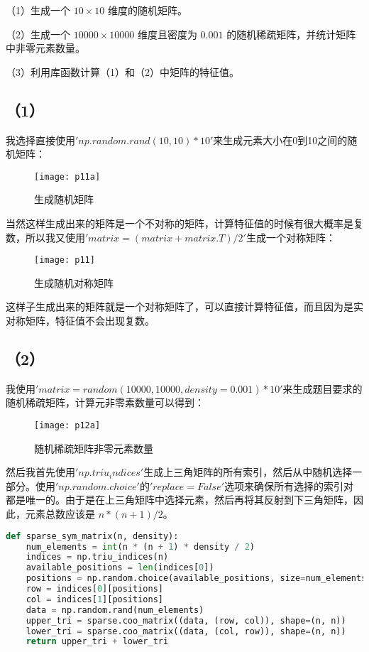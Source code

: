 \documentclass{source/Report}
\begin{document}
（1）生成一个 $10\times10$ 维度的随机矩阵。

（2）生成一个 $10000\times 10000$ 维度且密度为 $0.001$ 的随机稀疏矩阵，并统计矩阵中非零元素数量。

（3）利用库函数计算（1）和（2）中矩阵的特征值。

\subsection*{（1）}
我选择直接使用$'np.random.rand(10, 10) * 10'$来生成元素大小在0到10之间的随机矩阵：
\begin{figure}[H]
  \centering
  \texttt{[image: p11a]}
  \caption{生成随机矩阵}
\end{figure}

当然这样生成出来的矩阵是一个不对称的矩阵，计算特征值的时候有很大概率是复数，所以我又使用$'matrix = (matrix + matrix.T) / 2'$生成一个对称矩阵：
\begin{figure}[H]
  \centering
  \texttt{[image: p11]}
  \caption{生成随机对称矩阵}
\end{figure}

这样子生成出来的矩阵就是一个对称矩阵了，可以直接计算特征值，而且因为是实对称矩阵，特征值不会出现复数。

\subsection*{（2）}
我使用$'matrix = random(10000, 10000, density=0.001) * 10'$来生成题目要求的随机稀疏矩阵，计算元非零素数量可以得到：
\begin{figure}[H]
  \centering
  \texttt{[image: p12a]}
  \caption{随机稀疏矩阵非零元素数量}
\end{figure}

然后我首先使用$'np.triu_indices'$生成上三角矩阵的所有索引，然后从中随机选择一部分。使用$'np.random.choice'$的$'replace=False'$选项来确保所有选择的索引对都是唯一的。由于是在上三角矩阵中选择元素，然后再将其反射到下三角矩阵，因此，元素总数应该是 $n * (n + 1) / 2$。

\begin{lstlisting}[language = Python, title = {生成随机对称稀疏矩阵}]
def sparse_sym_matrix(n, density):
    num_elements = int(n * (n + 1) * density / 2)
    indices = np.triu_indices(n)
    available_positions = len(indices[0])
    positions = np.random.choice(available_positions, size=num_elements, replace=False)
    row = indices[0][positions]
    col = indices[1][positions]
    data = np.random.rand(num_elements)
    upper_tri = sparse.coo_matrix((data, (row, col)), shape=(n, n))
    lower_tri = sparse.coo_matrix((data, (col, row)), shape=(n, n))
    return upper_tri + lower_tri
\end{lstlisting}
\end{document}
